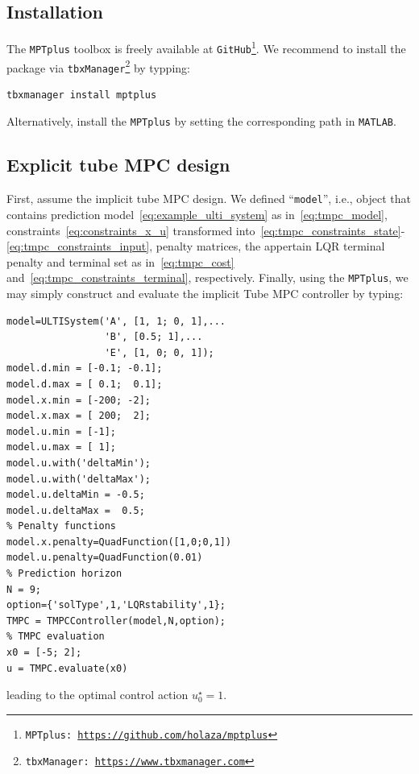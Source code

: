 \documentclass[letterpaper, 10 pt, conference]{ieeeconf}
\begin{document}
\subsection{Installation}
\label{sec:installation}

The \texttt{MPTplus} toolbox is freely available at \texttt{GitHub}\footnote{\texttt{MPTplus: \url{https://github.com/holaza/mptplus}}}. We recommend to install the package via \texttt{tbxManager}\footnote{\texttt{tbxManager: \url{https://www.tbxmanager.com}}} by typping:
\begin{lstlisting}[style=Matlab-editor]
	tbxmanager install mptplus
\end{lstlisting}
Alternatively, install the \texttt{MPTplus} by setting the corresponding path in \texttt{MATLAB}. 


\subsection{Explicit tube MPC design}
\label{sec:mptplus_tube_mpc}

First, assume the implicit tube MPC design. We defined ``\verb|model|'', i.e., object that contains prediction model~\eqref{eq:example_ulti_system} as in~\eqref{eq:tmpc_model}, constraints~\eqref{eq:constraints_x_u} transformed into~\eqref{eq:tmpc_constraints_state}-\eqref{eq:tmpc_constraints_input}, penalty matrices, the appertain LQR terminal penalty and terminal set as in~\eqref{eq:tmpc_cost} and~\eqref{eq:tmpc_constraints_terminal}, respectively. 
Finally, using the \texttt{MPTplus}, we may simply construct and evaluate the implicit Tube MPC controller by typing:
\begin{lstlisting}[style=Matlab-editor]
model=ULTISystem('A', [1, 1; 0, 1],...
                 'B', [0.5; 1],...
                 'E', [1, 0; 0, 1]);
model.d.min = [-0.1; -0.1]; 
model.d.max = [ 0.1;  0.1];
model.x.min = [-200; -2]; 
model.x.max = [ 200;  2];
model.u.min = [-1];
model.u.max = [ 1];
model.u.with('deltaMin');
model.u.with('deltaMax');
model.u.deltaMin = -0.5;
model.u.deltaMax =  0.5;
% Penalty functions
model.x.penalty=QuadFunction([1,0;0,1])
model.u.penalty=QuadFunction(0.01)
% Prediction horizon
N = 9;
option={'solType',1,'LQRstability',1};
TMPC = TMPCController(model,N,option);
% TMPC evaluation
x0 = [-5; 2];
u = TMPC.evaluate(x0)
\end{lstlisting}
leading to the optimal control action $u_{0}^{\star} = 1$.
\end{document}
